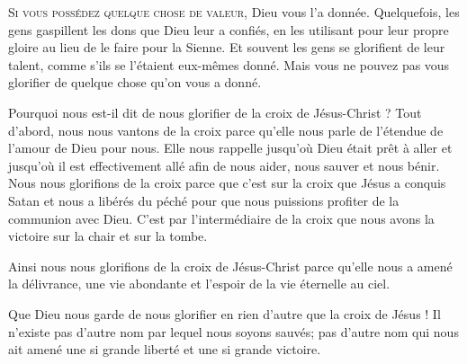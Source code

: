 \dvrule






\lettrine{S}{i vous possédez quelque chose de valeur,}
 Dieu vous l'a donnée. Quelquefois, les gens gaspillent les dons que Dieu
 leur a confiés, en les utilisant pour leur propre gloire au lieu
 de le faire pour la Sienne. Et souvent les gens se glorifient
 de leur talent, comme s'ils se l'étaient eux-mêmes donné.
 Mais vous ne pouvez pas vous glorifier de quelque chose qu'on vous a donné. 


Pourquoi nous est-il dit de nous glorifier de la croix de Jésus-Christ ?
 Tout d'abord, nous nous vantons de la croix parce qu'elle nous parle
 de l'étendue de l'amour de Dieu pour nous. Elle nous rappelle jusqu'où Dieu
 était prêt à aller \ocadr et jusqu'où il est effectivement allé \fcadr{}
 afin de nous aider, nous sauver et nous bénir.
 Nous nous glorifions de la croix parce que c'est sur la croix que Jésus
 a conquis Satan et nous a libérés du péché pour que nous puissions
 profiter de la communion avec Dieu. C'est par l'intermédiaire de la croix
 que nous avons la victoire sur la chair et sur la tombe.

Ainsi nous nous glorifions de la croix de Jésus-Christ
 parce qu'elle nous a amené la délivrance, une vie abondante et l'espoir
 de la vie éternelle au ciel.

Que Dieu nous garde de nous glorifier en rien d'autre que la croix de Jésus !
 Il n'existe pas d'autre nom par lequel nous soyons sauvés;
 pas d'autre nom qui nous ait amené une si grande liberté
 et une si grande victoire.

\dvrule




